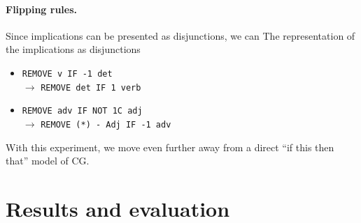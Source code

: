 \documentclass[11pt]{article}
\begin{document}
\paragraph{Flipping rules.}
Since implications can be presented as disjunctions, we can 
The representation of the implications as disjunctions 
\begin{itemize}
\item [] \texttt{REMOVE v IF -1 det} \\ $\rightarrow$ \texttt{REMOVE det IF 1 verb}   
\item [] \texttt{REMOVE adv IF NOT 1C adj} \\ $\rightarrow$ \texttt{REMOVE (*) - Adj  IF -1 adv}  \\
\end{itemize}

With this experiment, we move even further away from a direct ``if this then that'' model of CG.

\section{Results and evaluation}







\end{document}
